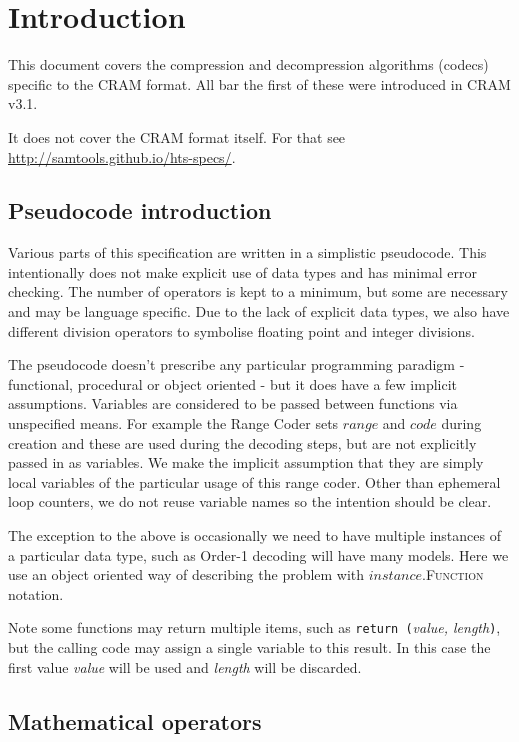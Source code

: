 \documentclass[a4paper]{article}
\begin{document}
\section{Introduction}

This document covers the compression and decompression algorithms
(codecs) specific to the CRAM format.  All bar the first of these were
introduced in CRAM v3.1.

It does not cover the CRAM format itself.  For that see \url{http://samtools.github.io/hts-specs/}.

\subsection{Pseudocode introduction}

Various parts of this specification are written in a simplistic
pseudocode.  This intentionally does not make explicit use of data
types and has minimal error checking.  The number of operators is kept
to a minimum, but some are necessary and may be language specific.
Due to the lack of explicit data types, we also have different
division operators to symbolise floating point and integer divisions.

The pseudocode doesn't prescribe any particular programming paradigm -
functional, procedural or object oriented - but it does have a few
implicit assumptions.  Variables are considered to be passed between
functions via unspecified means.  For example the Range Coder sets
$range$ and $code$ during creation and these are used during the
decoding steps, but are not explicitly passed in as variables.  We
make the implicit assumption that they are simply local variables of the
particular usage of this range coder.  Other than ephemeral loop
counters, we do not reuse variable names so the intention should be
clear.

The exception to the above is occasionally we need to have multiple
instances of a particular data type, such as Order-1 decoding will
have many models.  Here we use an object oriented way of describing
the problem with $instance$.\textsc{Function} notation.

Note some functions may return multiple items, such as
\texttt{return (}\textit{value, length}\texttt{)}, but the calling
code may assign a single variable to this result.  In this case the first
value \textit{value} will be used and \textit{length} will be discarded.

\subsection{Mathematical operators}
\end{document}
